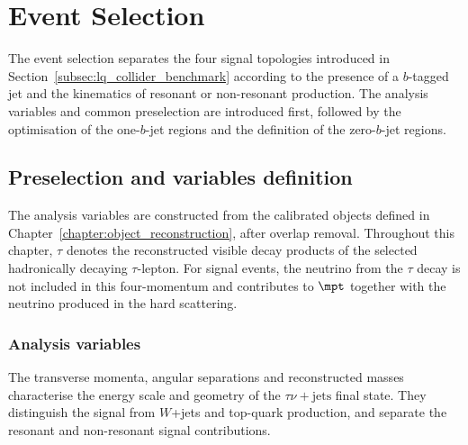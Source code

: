 \chapter{Event Selection}
\label{chapter:event_selection}

The event selection separates the four signal topologies introduced in Section~\ref{subsec:lq_collider_benchmark} according to the presence of a $b$-tagged jet and the kinematics of resonant or non-resonant production.
The analysis variables and common preselection are introduced first, followed by the optimisation of the one-$b$-jet regions and the definition of the zero-$b$-jet regions.

\section{Preselection and variables definition}
\label{sec:ch7_preselection}

The analysis variables are constructed from the calibrated objects defined in Chapter~\ref{chapter:object_reconstruction}, after overlap removal.
Throughout this chapter, $\tau$ denotes the reconstructed visible decay products of the selected hadronically decaying $\tau$-lepton.
For signal events, the neutrino from the $\tau$ decay is not included in this four-momentum and contributes to $\mpt$ together with the neutrino produced in the hard scattering.

\subsection{Analysis variables}
\label{subsec:ch7_variables}

The transverse momenta, angular separations and reconstructed masses characterise the energy scale and geometry of the $\tau\nu+\mathrm{jets}$ final state.
They distinguish the signal from $W$+jets and top-quark production, and separate the resonant and non-resonant signal contributions.

